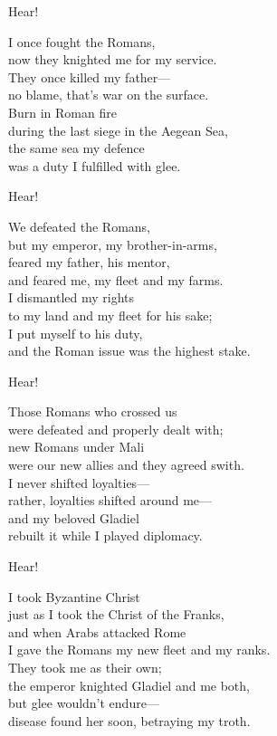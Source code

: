 \begin{lyrics}
Hear!

I once fought the Romans,\\
now they knighted me for my service.\\
They once killed my father—\\
no blame, that's war on the surface.\\
Burn in Roman fire\\
during the last siege in the Aegean Sea,\\
the same sea my defence\\
was a duty I fulfilled with glee.

Hear!

We defeated the Romans,\\
but my emperor, my brother-in-arms,\\
feared my father, his mentor,\\
and feared me, my fleet and my farms.\\
I dismantled my rights\\
to my land and my fleet for his sake;\\
I put myself to his duty,\\
and the Roman issue was the highest stake.

Hear!

Those Romans who crossed us\\
were defeated and properly dealt with;\\
new Romans under Mali\\
were our new allies and they agreed swith.\\
I never shifted loyalties—\\
rather, loyalties shifted around me—\\
and my beloved Gladiel\\
rebuilt it while I played diplomacy.

Hear!

I took Byzantine Christ\\
just as I took the Christ of the Franks,\\
and when Arabs attacked Rome\\
I gave the Romans my new fleet and my ranks.\\
They took me as their own;\\
the emperor knighted Gladiel and me both,\\
but glee wouldn't endure—\\
disease found her soon, betraying my troth.


\end{lyrics}

